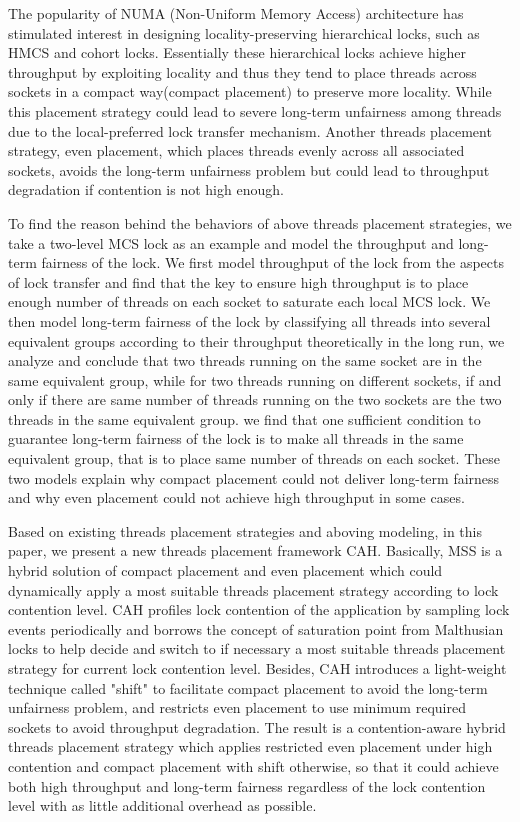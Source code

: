 \begin{englishabstract}
The popularity of NUMA (Non-Uniform Memory Access) architecture has stimulated interest in designing locality-preserving hierarchical locks, such as HMCS and cohort locks. Essentially these hierarchical locks achieve higher throughput by exploiting locality and thus they tend to place threads across sockets in a compact way(compact placement) to preserve more locality. While this placement strategy could lead to severe long-term unfairness among threads due to the local-preferred lock transfer mechanism. Another threads placement strategy, even placement, which places threads evenly across all associated sockets, avoids the long-term unfairness problem but could lead to throughput degradation if contention is not high enough.

To find the reason behind the behaviors of above threads placement strategies, we take a two-level MCS lock as an example and model the throughput and long-term fairness of the lock. We first model throughput of the lock from the aspects of lock transfer and find that the key to ensure high throughput is to place enough number of threads on each socket to saturate each local MCS lock. We then model long-term fairness of the lock by classifying all threads into several equivalent groups according to their throughput theoretically in the long run, we analyze and conclude that two threads running on the same socket are in the same equivalent group, while for two threads running on different sockets, if and only if there are same number of threads running on the two sockets are the two threads in the same equivalent group. we find that one sufficient condition to guarantee long-term fairness of the lock is to make all threads in the same equivalent group, that is to place same number of threads on each socket. These two models explain why compact placement could not deliver long-term fairness and why even placement could not achieve high throughput in some cases.

Based on existing threads placement strategies and aboving modeling, in this paper, we present a new threads placement framework CAH. Basically, MSS is a hybrid solution of compact placement and even placement which could dynamically apply a most suitable threads placement strategy according to lock contention level. CAH profiles lock contention of the application by sampling lock events periodically and borrows the concept of saturation point from Malthusian locks to help decide and switch to if necessary a most suitable threads placement strategy for current lock contention level. Besides, CAH introduces a light-weight technique called "shift" to facilitate compact placement to avoid the long-term unfairness problem, and restricts even placement to use minimum required sockets to avoid throughput degradation. The result is a contention-aware hybrid threads placement strategy which applies restricted even placement under high contention and compact placement with shift otherwise, so that it could achieve both high throughput and long-term fairness regardless of the lock contention level with as little additional overhead as possible.

\end{englishabstract}


